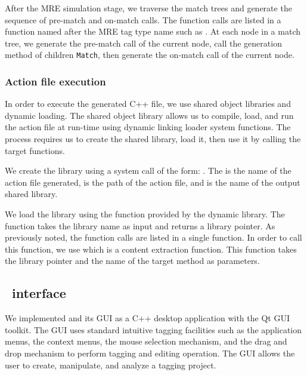 After the MRE simulation stage, we traverse the match trees and generate the sequence of pre-match and on-match calls. 
The function calls are listed in a function named after the MRE tag type name such as . 
At each node in a match tree, we generate the pre-match call of the current node, call the generation method of children {\tt Match}, then generate the on-match call of the current node.

\subsubsection{Action file execution}

In order to execute the generated C++ file, we use shared object libraries and dynamic loading. 
The shared object library allows us to compile, load, and run the action file at run-time using dynamic linking loader system functions. 
The process requires us to create the shared library, load it, then use it by calling the target functions.

We create the library using a system call of the form: 
\newline
{}.
\newline
The  is the name of the action file generated,  is the path of the action file, and  is the name of the output shared library.

We load the library using the  function provided by the dynamic library. 
The function takes the library name as input and returns a library pointer. 
As previously noted, the function calls are listed in a single function. 
In order to call this function, we use  which is a content extraction function. 
This function takes the library pointer and the name of the target method as parameters.

\subsection{\framework~interface}

We implemented \framework and its GUI as a C++ desktop application 
with the Qt GUI toolkit. 
The \framework GUI uses standard intuitive tagging facilities such as 
the application menus, the context menus, the mouse selection mechanism,
and the drag and drop mechanism to perform tagging and editing operation. 
The \framework GUI allows the user to create, manipulate, and analyze a tagging project.

